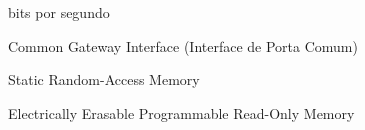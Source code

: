 \item [BPS] bits por segundo
\item [CGI] Common Gateway Interface (Interface de Porta Comum)
\item [SRAM] Static Random-Access Memory
\item [EEPROM]  Electrically Erasable Programmable Read-Only Memory


